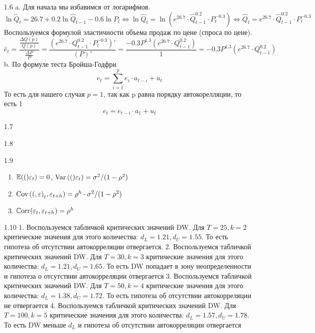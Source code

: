 \protect \hypertarget {soln:1.6}{}
\begin{solution}{{1.6}}
a. Для начала мы избавимся от логарифмов.
\[\ln \hat{Q}_t = 26.7 + 0.2 \ln \hat{Q}_{t-1} - 0.6\ln P_t 
\Leftrightarrow 
\ln \hat{Q}_t = \ln \left(e^{26.7} \cdot \hat{Q}_{t-1} ^ {0.2} \cdot P_t ^ {-0.3}\right) \Leftrightarrow 
\hat{Q}_t = e^{26.7} \cdot \hat{Q}_{t-1} ^ {0.2} \cdot P_t ^ {-0.3}\]
Воспользуемся формулой эластичности объема продаж по цене (спроса по цене).
\[\hat{e}_t = \frac{\frac{\Delta Q(p)}{Q(p)}}{\frac{\Delta P}{P}} = \frac{(e^{26.7} \cdot Q_{t-1} ^ {0.2} \cdot P_t ^ {-0.3})'}{(P)'} = \frac{-0.3 P ^ {1.3}(e^{26.7} \cdot Q_{t-1} ^ {0.2})}{1} = -0.3 P ^ {1.3}(e^{26.7} \cdot Q_{t-1} ^ {0.2})\]
b. По формуле теста Бройша-Годфри
\[e_t = \sum_{i = 1}^p e_i \cdot a_{t-i} + u_t\]
То есть для нашего случая $p = 1$, так как p равна порядку автокорелляции, то есть 1
\[e_t =  e_{t-i} \cdot a_{1} + u_t\]
\end{solution}
\protect \hypertarget {soln:1.7}{}
\begin{solution}{{1.7}}
\end{solution}
\protect \hypertarget {soln:1.8}{}
\begin{solution}{{1.8}}
\end{solution}
\protect \hypertarget {soln:1.9}{}
\begin{solution}{{1.9}}
\begin{enumerate}
\item $\mathbb{E}{\left((\right)}\varepsilon_t)=0$, $\operatorname{Var}{\left((\right)}\varepsilon_t)=\sigma^2/(1-\rho^2)$
\item $\operatorname{Cov}{\left((, \varepsilon\right)}_t,\varepsilon_{t+h})=\rho^h\cdot \sigma^2/(1-\rho^2)$
\item $\operatorname{\mathbb{C}\mathrm{orr}}(\varepsilon_t,\varepsilon_{t+h})=\rho^h$
\end{enumerate}
\end{solution}
\protect \hypertarget {soln:1.10}{}
\begin{solution}{{1.10}}
1. Воспользуемся табличкой критических значений DW. 
Для $T = 25, k = 2$ критические значения для этого количества: $d_L = 1.21, d_U = 1.55$. 
То есть гипотеза об отсутствии автокорреляции отвергается.
2. Воспользуемся табличкой критических значений DW. 
Для $T = 30, k = 3$ критические значения для этого количества: $d_L = 1.21, d_U = 1.65$. 
То есть DW попадает в зону неопределенности и гипотеза о отсутствии автокорреляции отвергается
3. Воспользуемся табличкой критических значений DW. 
Для $T = 50, k = 4$ критические значения для этого количества: $d_L = 1.38, d_U = 1.72$. 
То есть гипотеза об отсутствии автокорреляции не отвергается
4. Воспользуемся табличкой критических значений DW. 
Для $T = 100, k = 5$ критические значения для этого количества: $d_L = 1.57, d_U = 1.78$. 
То есть DW меньше  $d_L$ и гипотеза об отсутствии автокорреляции отвергается
\end{solution}

